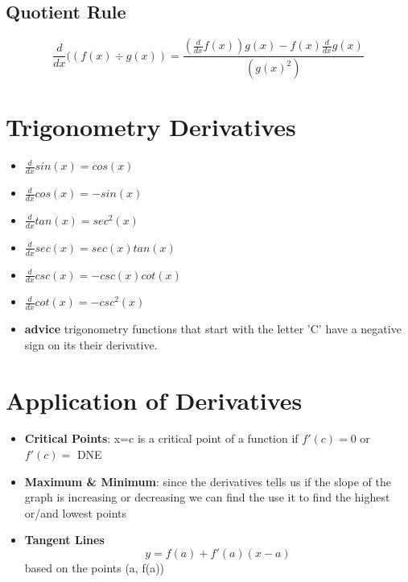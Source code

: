 \documentclass[12pt]{article}
\begin{document}
\subsection{Quotient Rule}
\begin{equation}
        \frac{d}{dx}((f(x) \div g(x))=\frac{(\frac{d}{dx}f(x))g(x) - f(x)\frac{d}{dx}g(x)}{(g(x)^{2})}
\end{equation}



\section{Trigonometry Derivatives}
\begin{itemize}
    \item $\frac{d}{dx}sin(x) = cos(x)$
    \newline 
    \item$\frac{d}{dx}cos(x) = -sin(x) $
    \newline 
    \item $\frac{d}{dx}tan(x) = sec^{2}(x)$ 
    \newline 
    \item $\frac{d}{dx} sec(x) = sec(x)tan(x)$
    \newline
    \item $\frac{d}{dx} csc(x) = -csc(x)cot(x)$
    \newline 
    \item $\frac{d}{dx} cot(x) = -csc^{2}(x)$
    \newline 
    \item \textbf{advice} trigonometry functions that start with the letter 'C' have a negative sign on its their derivative. 
\end{itemize}
\section{Application of Derivatives}
\begin{itemize}
    \item \textbf{Critical Points}: x=c is a critical point of a function if $ f'(c)=0 $ or $f'(c)=$ DNE
    \item \textbf{Maximum & Minimum}: since the derivatives tells us if the slope of the graph is increasing or decreasing we can find the use it to find the highest or/and lowest points
    \item \textbf{Tangent Lines}
    \begin{equation}
        y= f(a) + f'(a)(x-a)  
    \end{equation}based on the points (a, f(a))
\end{itemize}
\end{document}
